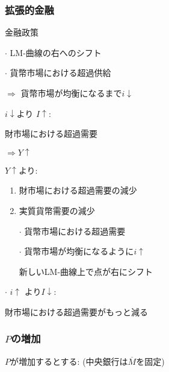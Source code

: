 \documentclass[a4paper, 12pt]{article}
\begin{document}
\subsubsection{拡張的金融}
金融政策

  \quad $\cdot$ LM-曲線の右へのシフト

  \quad $\cdot$ 貨幣市場における超過供給

  $\Rightarrow$ 貨幣市場が均衡になるまで$i \downarrow$

  \noindent
$i \downarrow$より $I \uparrow$:

  \quad 財市場における超過需要

  \quad $\Rightarrow Y \uparrow$

  \noindent
$Y \uparrow$より:
  \begin{enumerate}
    \item 財市場における超過需要の減少
    \item 実質貨幣需要の減少

    \qquad $\cdot$ 貨幣市場における超過需要

    \qquad $\cdot$ 貨幣市場が均衡になるように$i \uparrow$

\qquad 新しいLM-曲線上で点が右にシフト
    \end{enumerate}


  \noindent
  $\cdot$  $i \uparrow$ より$I \downarrow$:

	\quad 財市場における超過需要がもっと減る
\subsubsection{$P$の増加}
$P$が増加するとする: (中央銀行は$\overline{M}$を固定)
\end{document}
